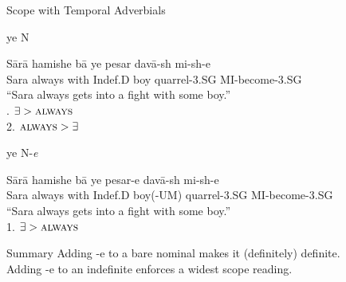 \documentclass[10pt]{beamer}
\begin{document}
\begin {frame} {Scope with Temporal Adverbials}

\begin {exampleblock} {ye N}
{\footnotesize
	\begin {exe}
		\ex \label {} \gll	S\={a}r\={a}	hamishe		b\={a}	ye pesar		dav\={a}-sh	mi-sh-e\\
				Sara	always 	with		{\scriptsize Indef.D} boy	quarrel{\scriptsize -3.SG}	{\scriptsize MI-}become{\scriptsize -3.SG}\\
			``Sara always gets into a fight with some boy.'' \\ . $\exists > \textsc{always}$ \\ 2. $\textsc{always} > \exists $\\
	\end {exe}}
\end {exampleblock}
\pause
\begin {exampleblock} {ye N-\emph{{\color {red}e}}}
{\footnotesize
	\begin {exe}
		\ex \label {} \gll	S\={a}r\={a}	hamishe		b\={a}	ye pesar{\color {red}-e}		dav\={a}-sh	mi-sh-e\\
				Sara	always 	with		{\scriptsize Indef.D} boy({\scriptsize -UM})	quarrel{\scriptsize -3.SG}	{\scriptsize MI-}become{\scriptsize -3.SG}\\
			``Sara always gets into a fight with some boy.'' \\ 1. $\exists > \textsc{always}$
	\end {exe}}
\end {exampleblock}

\end {frame}


\begin {frame} {Summary}
Adding -{\color {red}e} to a bare nominal makes it (definitely) definite. \\
Adding -{\color {red}e} to an indefinite enforces a widest scope reading.
\end {frame}
\end{document}
